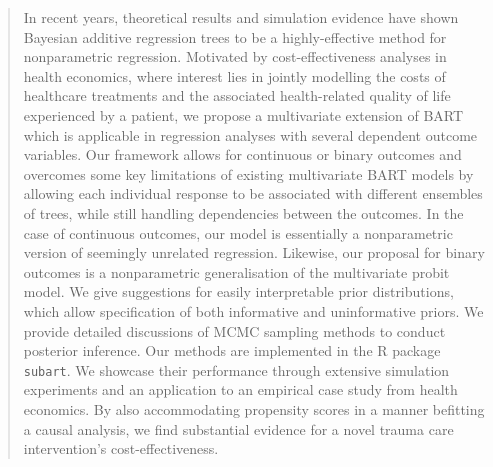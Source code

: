 \documentclass[aoas,preprint]{imsart}
\theoremstyle{plain}
\theoremstyle{definition}
\theoremstyle{remark}
\begin{document}
\begin{frontmatter}
\begin{aug}
\address[D]{Department of Epidemiology and Data Science, Amsterdam University Medical Center,}

\address[E]{Hamilton Institute and Department of Mathematics and Statistics, Maynooth University,}


\end{aug}

\begin{abstract}
In recent years, theoretical results and simulation evidence have shown Bayesian additive regression trees to be a highly-effective method for nonparametric regression. Motivated by cost-effectiveness analyses in health economics, where interest lies in jointly modelling the costs of healthcare treatments and the associated health-related quality of life experienced by a patient, we propose a multivariate extension of BART which is applicable in regression analyses with several dependent outcome variables.
Our framework allows for continuous or binary outcomes and overcomes some key limitations of existing multivariate BART models by allowing each individual response to be associated with different ensembles of trees, while still handling dependencies between the outcomes. In the case of continuous outcomes, our model is essentially a nonparametric version of seemingly unrelated regression. Likewise, our proposal for binary outcomes is a nonparametric generalisation of the multivariate probit model. We give suggestions for easily interpretable prior distributions, which allow specification of both informative and uninformative priors.
We provide detailed discussions of MCMC sampling methods to conduct posterior inference. Our methods are implemented in the \textsf{R} package \texttt{subart}. We showcase their performance through extensive simulation experiments and an application to an empirical case study from health economics. By also accommodating propensity scores in a manner befitting a causal analysis, we find substantial evidence for a novel trauma care intervention's cost-effectiveness.
\end{abstract}

\begin{keyword}
\end{keyword}

\end{frontmatter}
\end{document}
